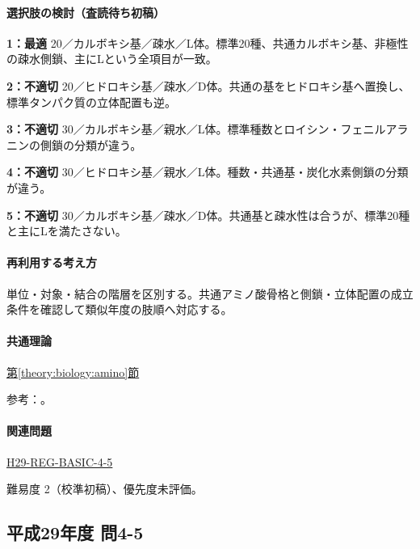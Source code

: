 \paragraph{選択肢の検討（査読待ち初稿）}\mbox{}\par

\noindent\textbf{1：最適} 20／カルボキシ基／疎水／L体。標準20種、共通カルボキシ基、非極性の疎水側鎖、主にLという全項目が一致。\par

\noindent\textbf{2：不適切} 20／ヒドロキシ基／疎水／D体。共通の基をヒドロキシ基へ置換し、標準タンパク質の立体配置も逆。\par

\noindent\textbf{3：不適切} 30／カルボキシ基／親水／L体。標準種数とロイシン・フェニルアラニンの側鎖の分類が違う。\par

\noindent\textbf{4：不適切} 30／ヒドロキシ基／親水／L体。種数・共通基・炭化水素側鎖の分類が違う。\par

\noindent\textbf{5：不適切} 30／カルボキシ基／疎水／D体。共通基と疎水性は合うが、標準20種と主にLを満たさない。\par

\paragraph{再利用する考え方} 単位・対象・結合の階層を区別する。共通アミノ酸骨格と側鎖・立体配置の成立条件を確認して類似年度の肢順へ対応する。

\paragraph{共通理論} \hyperref[theory:biology:amino]{第\ref*{theory:biology:amino}節}

\par 参考：\cite{mit_amino}。

\paragraph{関連問題} \hyperref[q:h29-reg-basic-4-5]{H29-REG-BASIC-4-5}

\par 難易度 2（校準初稿）、優先度未評価。

\subsection{平成29年度 問4-5}
\label{q:h29-reg-basic-4-5}

